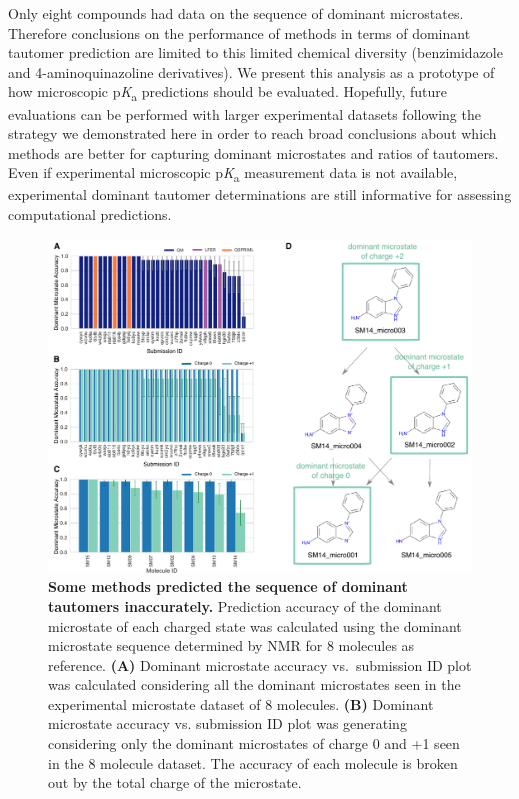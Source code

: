 \documentclass[9pt,lineno,final]{elife}
\newcommand{\pKa}{p\textit{K}\textsubscript{a}}
\begin{document}
Only eight compounds had data on the sequence of dominant microstates. 
Therefore conclusions on the performance of methods in terms of dominant tautomer prediction are limited to this limited chemical diversity (benzimidazole and 4-aminoquinazoline derivatives). 
We present this analysis as a prototype of how microscopic \pKa{} predictions should be evaluated.
Hopefully, future evaluations can be performed with larger experimental datasets following the strategy we demonstrated here in order to reach broad conclusions about which methods are better for capturing dominant microstates and ratios of tautomers. 
Even if experimental microscopic \pKa{} measurement data is not available, experimental dominant tautomer determinations are still informative for assessing computational predictions.  
  

\begin{figure}[h!]
\centering
\includegraphics[width=1.0\linewidth]{figures/typeI_dominant_microstate_accuracy.pdf}
\caption{{\bf Some methods predicted the sequence of dominant tautomers inaccurately.} 
Prediction accuracy of the dominant microstate of each charged state was calculated using the dominant microstate sequence determined by NMR for 8 molecules as reference. 
{\bf(A)} Dominant microstate accuracy vs.\ submission ID plot was calculated considering all the dominant microstates seen in the experimental microstate dataset of 8 molecules. {\bf(B)} Dominant microstate accuracy vs. submission ID plot was generating considering only the dominant microstates of charge 0 and +1 seen in the 8 molecule dataset. 
The accuracy of each molecule is broken out by the total charge of the microstate. 
}
\end{figure}
\end{document}
